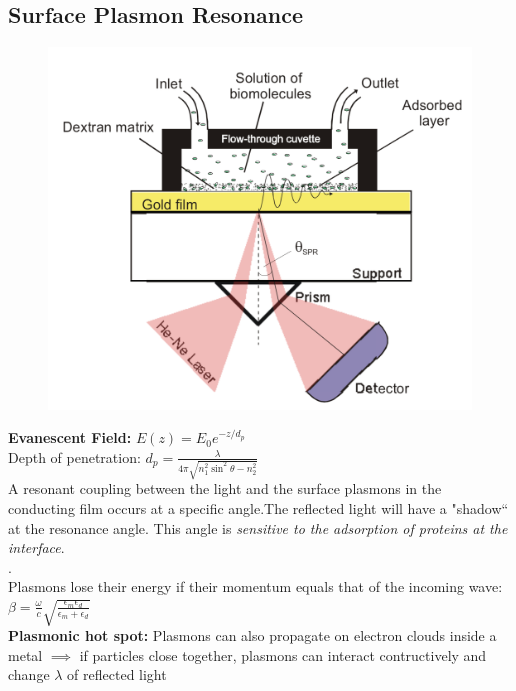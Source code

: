 \documentclass[9pt]{article}
\begin{document}
\begin{multicols}{2}
\subsection{Surface Plasmon Resonance}
\begin{figure}
\includegraphics[width=\linewidth]{Images/surface_plasmon_resonance.png}
\end{figure}
\textbf{Evanescent Field: } $E(z)=E_0 e^{-z/d_p}$\\
Depth of penetration: $d_p = \frac{\lambda}{4\pi \sqrt{n_1 ^2 \sin ^2 \theta -n_2 ^2}}$\\
A resonant coupling between the light and the surface plasmons in the conducting film occurs at a specific angle.The reflected light will have a "shadow“ at the resonance angle. This angle is \textit{sensitive to the adsorption of proteins at the interface}. \\
.\\
Plasmons lose their energy if their momentum equals that of the incoming wave: $\beta = \frac{\omega}{c}\sqrt{\frac{\epsilon _m \epsilon _d}{\epsilon _m + \epsilon _d}}$\\
\textbf{Plasmonic hot spot: } Plasmons can also propagate on electron clouds inside a metal $\implies$ if particles close together, plasmons can interact contructively and change $\lambda$ of reflected light


\end{multicols}
\end{document}
